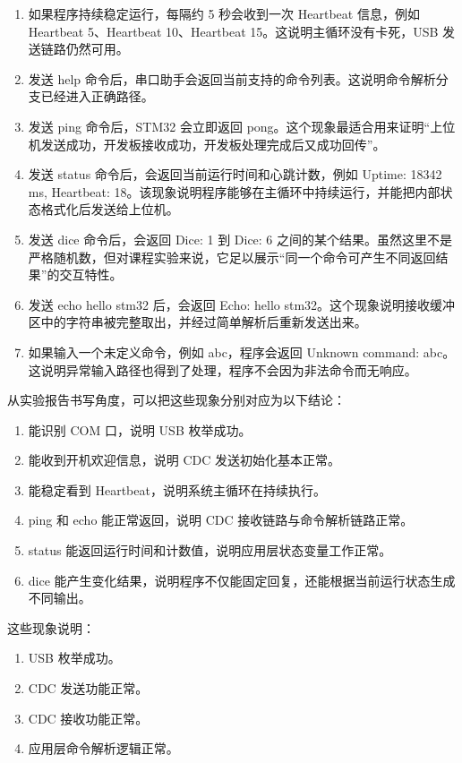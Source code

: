 \documentclass[
  chinese,
  UTF8,
  oneside,
  openany]{ctexbook}
\providecommand{\tightlist}{%
  \setlength{\itemsep}{0pt}\setlength{\parskip}{0pt}}
\begin{document}
\begin{enumerate}
\def\labelenumi{\arabic{enumi}.}
\setcounter{enumi}{1}
\tightlist
\item
  如果程序持续稳定运行，每隔约 5 秒会收到一次 Heartbeat 信息，例如
  Heartbeat 5、Heartbeat 10、Heartbeat 15。这说明主循环没有卡死，USB
  发送链路仍然可用。
\item
  发送 help
  命令后，串口助手会返回当前支持的命令列表。这说明命令解析分支已经进入正确路径。
\item
  发送 ping 命令后，STM32 会立即返回
  pong。这个现象最适合用来证明``上位机发送成功，开发板接收成功，开发板处理完成后又成功回传''。
\item
  发送 status 命令后，会返回当前运行时间和心跳计数，例如 Uptime: 18342
  ms, Heartbeat:
  18。该现象说明程序能够在主循环中持续运行，并能把内部状态格式化后发送给上位机。
\item
  发送 dice 命令后，会返回 Dice: 1 到 Dice: 6
  之间的某个结果。虽然这里不是严格随机数，但对课程实验来说，它足以展示``同一个命令可产生不同返回结果''的交互特性。
\item
  发送 echo hello stm32 后，会返回 Echo: hello
  stm32。这个现象说明接收缓冲区中的字符串被完整取出，并经过简单解析后重新发送出来。
\item
  如果输入一个未定义命令，例如 abc，程序会返回 Unknown command:
  abc。这说明异常输入路径也得到了处理，程序不会因为非法命令而无响应。
\end{enumerate}

从实验报告书写角度，可以把这些现象分别对应为以下结论：

\begin{enumerate}
\def\labelenumi{\arabic{enumi}.}
\tightlist
\item
  能识别 COM 口，说明 USB 枚举成功。
\item
  能收到开机欢迎信息，说明 CDC 发送初始化基本正常。
\item
  能稳定看到 Heartbeat，说明系统主循环在持续执行。
\item
  ping 和 echo 能正常返回，说明 CDC 接收链路与命令解析链路正常。
\item
  status 能返回运行时间和计数值，说明应用层状态变量工作正常。
\item
  dice
  能产生变化结果，说明程序不仅能固定回复，还能根据当前运行状态生成不同输出。
\end{enumerate}

这些现象说明：

\begin{enumerate}
\def\labelenumi{\arabic{enumi}.}
\tightlist
\item
  USB 枚举成功。
\item
  CDC 发送功能正常。
\item
  CDC 接收功能正常。
\item
  应用层命令解析逻辑正常。
\end{enumerate}
\end{document}

